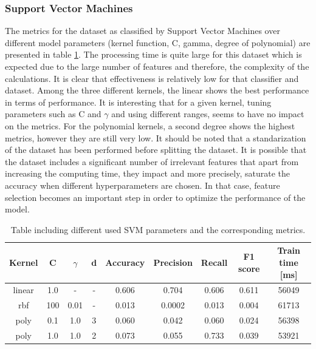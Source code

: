 \documentclass{article}
\begin{document}
\subsubsection*{Support Vector Machines}

The metrics for the dataset as classified by Support Vector Machines over different model parameters (kernel function, C, gamma, degree of polynomial) are presented in table \ref{table:reviews_SVM}. The processing time is quite large for this dataset which is expected due to the large number of features and therefore, the complexity of the calculations. It is clear that effectiveness is relatively low for that classifier and dataset. Among the three different kernels, the linear shows the best performance in terms of performance. It is interesting that for a given kernel, tuning parameters such as C and $\gamma$ and using different ranges, seems to have no impact on the metrics. For the polynomial kernels, a second degree shows the highest metrics, however they are still very low. It should be noted that a standarization of the dataset has been performed before splitting the dataset. It is possible that the dataset includes a significant number of irrelevant features that apart from increasing the computing time, they impact and more precisely, saturate the accuracy when different hyperparameters are chosen. In that case, feature selection becomes an important step in order to optimize the performance of the model. 
\begin{table}[h!]
\centering
\begin{tabular}{||c c c c c c c c c||} 
 \hline
 Kernel & C & $\gamma$ &d & Accuracy & Precision & Recall & F1 score & Train time [ms]\\ [0.5ex] 
 \hline\hline
 linear & 1.0 & - & - & 0.606 & 0.704 & 0.606 & 0.611 &56049\\ 
 rbf & 100 & 0.01 & - & 0.013 & 0.0002 & 0.013 & 0.004 & 61713\\
 poly & 0.1 &  1.0 & 3 & 0.060 & 0.042 & 0.060 & 0.024 & 56398\\
 poly & 1.0 &  1.0&  2 & 0.073 & 0.055 & 0.733 & 0.039& 53921 \\ [1ex] 
 \hline
\end{tabular}
\caption{Table including different used SVM parameters and the corresponding metrics.}
\label{table:reviews_SVM}
\end{table}
\\
\end{document}
